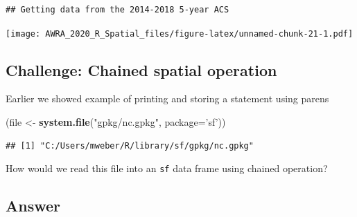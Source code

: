 \documentclass[
]{book}
\newenvironment{Shaded}{\begin{snugshade}}{\end{snugshade}}
\newcommand{\DataTypeTok}[1]{\textcolor[rgb]{0.13,0.29,0.53}{#1}}
\newcommand{\DecValTok}[1]{\textcolor[rgb]{0.00,0.00,0.81}{#1}}
\newcommand{\KeywordTok}[1]{\textcolor[rgb]{0.13,0.29,0.53}{\textbf{#1}}}
\newcommand{\NormalTok}[1]{#1}
\newcommand{\OperatorTok}[1]{\textcolor[rgb]{0.81,0.36,0.00}{\textbf{#1}}}
\newcommand{\OtherTok}[1]{\textcolor[rgb]{0.56,0.35,0.01}{#1}}
\newcommand{\StringTok}[1]{\textcolor[rgb]{0.31,0.60,0.02}{#1}}
\begin{document}
\begin{verbatim}
## Getting data from the 2014-2018 5-year ACS
\end{verbatim}

\begin{Shaded}
\end{Shaded}

\texttt{[image: AWRA\_2020\_R\_Spatial\_files/figure-latex/unnamed-chunk-21-1.pdf]}

\hypertarget{challenge-chained-spatial-operation}{%
\subsection{Challenge: Chained spatial operation}\label{challenge-chained-spatial-operation}}

Earlier we showed example of printing and storing a statement using parens

\begin{Shaded}
\begin{Highlighting}[]
\NormalTok{(file <-}\StringTok{ }\KeywordTok{system.file}\NormalTok{(}\StringTok{"gpkg/nc.gpkg"}\NormalTok{, }\DataTypeTok{package=}\StringTok{'sf'}\NormalTok{))}
\end{Highlighting}
\end{Shaded}

\begin{verbatim}
## [1] "C:/Users/mweber/R/library/sf/gpkg/nc.gpkg"
\end{verbatim}

How would we read this file into an \texttt{sf} data frame using chained operation?

\hypertarget{answer}{%
\subsection{Answer}\label{answer}}
\end{document}
